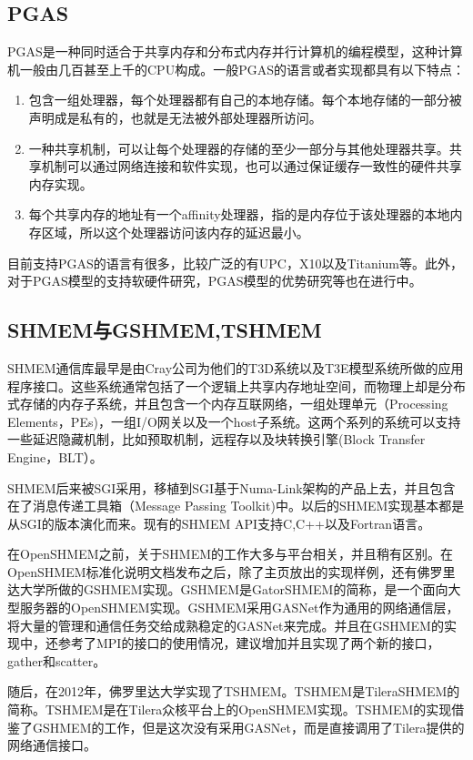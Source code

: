 \subsection{PGAS}
PGAS是一种同时适合于共享内存和分布式内存并行计算机的编程模型，这种计算机一般由几百甚至上千的CPU构成。一般PGAS的语言或者实现都具有以下特点：
\begin{enumerate}
\item 包含一组处理器，每个处理器都有自己的本地存储。每个本地存储的一部分被声明成是私有的，也就是无法被外部处理器所访问。
\item 一种共享机制，可以让每个处理器的存储的至少一部分与其他处理器共享。共享机制可以通过网络连接和软件实现，也可以通过保证缓存一致性的硬件共享内存实现。
\item 每个共享内存的地址有一个affinity处理器，指的是内存位于该处理器的本地内存区域，所以这个处理器访问该内存的延迟最小。
\end{enumerate}
目前支持PGAS的语言有很多\cite{book:encyclopedia}，比较广泛的有UPC，X10以及Titanium等。此外，对于PGAS模型的支持软硬件研究，PGAS模型的优势研究等也在进行中\cite{jour:NIC}。
\subsection{SHMEM与GSHMEM,TSHMEM}
SHMEM通信库最早是由Cray公司为他们的T3D系统以及T3E模型系统所做的应用程序接口。这些系统通常包括了一个逻辑上共享内存地址空间，而物理上却是分布式存储的内存子系统，并且包含一个内存互联网络，一组处理单元（Processing Elements，PEs)，一组I/O网关以及一个host子系统。这两个系列的系统可以支持一些延迟隐藏机制，比如预取机制，远程存以及块转换引擎(Block Transfer Engine，BLT）。

SHMEM后来被SGI采用，移植到SGI基于Numa-Link架构的产品上去，并且包含在了消息传递工具箱（Message Passing Toolkit)中。以后的SHMEM实现基本都是从SGI的版本演化而来。现有的SHMEM API支持C,C++以及Fortran语言\cite{site:openshmem_spec}。

在OpenSHMEM之前，关于SHMEM的工作大多与平台相关，并且稍有区别。在OpenSHMEM标准化说明文档发布之后，除了主页放出的实现样例，还有佛罗里达大学所做的GSHMEM实现\cite{jour:gshmem}。GSHMEM是GatorSHMEM的简称，是一个面向大型服务器的OpenSHMEM实现。GSHMEM采用GASNet作为通用的网络通信层，将大量的管理和通信任务交给成熟稳定的GASNet来完成。并且在GSHMEM的实现中，还参考了MPI的接口的使用情况，建议增加并且实现了两个新的接口，gather和scatter。

随后，在2012年，佛罗里达大学实现了TSHMEM\cite{jour:tshmem}。TSHMEM是TileraSHMEM的简称。TSHMEM是在Tilera众核平台上的OpenSHMEM实现。TSHMEM的实现借鉴了GSHMEM的工作，但是这次没有采用GASNet，而是直接调用了Tilera提供的网络通信接口。

